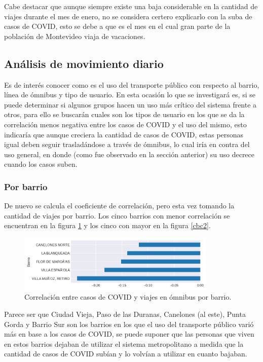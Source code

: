 \documentclass[conference]{IEEEtran}
\begin{document}
Cabe destacar que aunque siempre existe una baja considerable en la cantidad de viajes durante el mes de enero, no se considera certero explicarlo con la suba de casos de COVID, esto se debe a que es el mes en el cual gran parte de la población de Montevideo viaja de vacaciones.

\subsection{Análisis de movimiento diario}

Es de interés conocer como es el uso del transporte público con respecto al barrio, línea de ómnibus y tipo de usuario. En esta ocasión lo que se investigará es, si se puede determinar si algunos grupos hacen un uso más crítico del sistema frente a otros, para ello se buscarán cuales son los tipos de usuario en los que se da la correlación menos negativa entre los casos de COVID y el uso del mismo, esto indicaría que aunque creciera la cantidad de casos de COVID, estas personas igual deben seguir trasladándose a través de ómnibus, lo cual iría en contra del uso general, en donde (como fue observado en la sección anterior) su uso decrece cuando los casos suben.

\subsubsection{Por barrio}

De nuevo se calcula el coeficiente de correlación, pero esta vez tomando la cantidad de viajes por barrio. Los cinco barrios con menor correlación se encuentran en la figura \ref{cbc1} y los cinco con mayor en la figura \ref{cbc2}.

\begin{figure}[htbp]
\centerline{\includegraphics[width=95mm]{Pictures/cb1c.png}}
\caption{Correlación entre casos de COVID y viajes en ómnibus por barrio.}
\label{cbc1}
\end{figure}

Parece ser que Ciudad Vieja, Paso de las Duranas, Canelones (al este), Punta Gorda y Barrio Sur son los barrios en los que el uso del transporte público varió más en base a los casos de COVID, se puede suponer que las personas que viven en estos barrios dejaban de utilizar el sistema metropolitano a medida que la cantidad de casos de COVID subían y lo volvían a utilizar en cuanto bajaban. 
\end{document}
